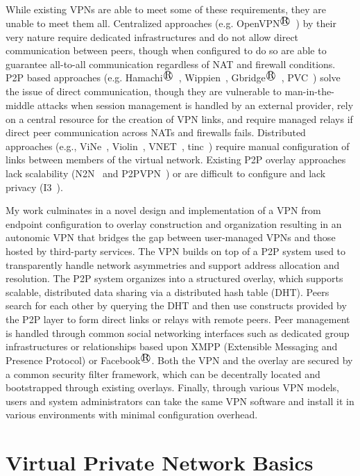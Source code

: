 While existing VPNs are able to meet some of these requirements, they are
unable to meet them all.  Centralized approaches (e.g.  OpenVPN$^\registered$~\cite{openvpn})
by their very nature require dedicated infrastructures and do not allow direct
communication between peers, though when configured to do so are able to
guarantee all-to-all communication regardless of NAT and firewall conditions.
P2P based approaches (e.g.  Hamachi$^\registered$~\cite{hamachi}, Wippien~\cite{wippien},
Gbridge$^\registered$~\cite{gbridge}, PVC~\cite{pvc}) solve the issue of direct
communication, though they are vulnerable to man-in-the-middle attacks when
session management is handled by an external provider, rely on a central
resource for the creation of VPN links, and require managed relays if direct
peer communication across NATs and firewalls fails.  Distributed approaches
(e.g., ViNe~\cite{vine}, Violin~\cite{violin}, VNET~\cite{vnet},
tinc~\cite{tinc}) require manual configuration of links between members of the
virtual network.  Existing P2P overlay approaches lack scalability
(N2N~\cite{n2n} and P2PVPN~\cite{p2pvpn}) or are difficult to configure and
lack privacy (I3~\cite{i3}).

My work culminates in a novel design and implementation of a VPN from endpoint
configuration to overlay construction and organization resulting in an
autonomic VPN that bridges the gap between user-managed VPNs and those hosted
by third-party services.  The VPN builds on top of a P2P system used to
transparently handle network asymmetries and support address allocation and
resolution.  The P2P system organizes into a structured overlay, which supports
scalable, distributed data sharing via a distributed hash table (DHT).  Peers
search for each other by querying the DHT and then use constructs provided by
the P2P layer to form direct links or relays with remote peers.  Peer
management is handled through common social networking interfaces such as
dedicated group infrastructures or relationships based upon XMPP (Extensible
Messaging and Presence Protocol) or Facebook$^\registered$.  Both the VPN and the overlay are
secured by a common security filter framework, which can be decentrally located
and bootstrapped through existing overlays.  Finally, through various VPN
models, users and system administrators can take the same VPN software and
install it in various environments with minimal configuration overhead.

\section{Virtual Private Network Basics}

